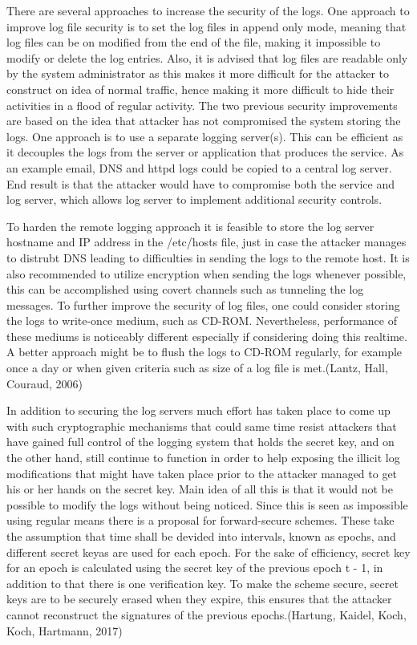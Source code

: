 \documentclass{article}
\begin{document}
There are several approaches to increase the security of the logs. One approach to improve log file security is to set the log files in append only mode, meaning that log files can be on modified from the end of the file, making it impossible to modify or delete the log entries. Also, it is advised that log files are readable only by the system administrator as this makes it more difficult for the attacker to construct on idea of normal traffic, hence making it more difficult to hide their activities in a flood of regular activity. The two previous security improvements are based on the idea that attacker has not compromised the system storing the logs.  One approach is to use a separate logging server(s). This can be efficient as it decouples the logs from the server or application that produces the service. As an example email, DNS and httpd logs could be copied to a central log server. End result is that the attacker would have to compromise both the service and log server, which allows log server to implement additional security controls.
\par
To harden the remote logging approach it is feasible to store the log server hostname and IP address in the /etc/hosts file, just in case the attacker manages to distrubt DNS leading to difficulties in sending the logs to the remote host. It is also recommended to utilize encryption when sending the logs whenever possible, this can be accomplished using covert channels such as tunneling the log messages. To further improve the security of log files, one could consider storing the logs to write-once medium, such as CD-ROM. Nevertheless, performance of these mediums is noticeably different especially if considering doing this realtime. A better approach might be to flush the logs to CD-ROM regularly, for example once a day or when given criteria such as size of a log file is met.(Lantz, Hall, Couraud, 2006)
\par
In addition to securing the log servers much effort has taken place to come up with such cryptographic mechanisms that could same time resist attackers that have gained full control of the logging system that holds the secret key, and on the other hand, still continue to function in order to help exposing the illicit log modifications that might have taken place prior to the attacker managed to get his or her hands on the secret key. Main idea of all this is that it would not be possible to modify the logs without being noticed. Since this is seen as impossible using regular means there is a proposal for forward-secure schemes. These take the assumption that time shall be devided into intervals, known as epochs, and different secret keyas are used for each epoch. For the sake of efficiency, secret key for an epoch is calculated using the secret key of the previous epoch t - 1, in addition to that there is one verification key. To make the scheme secure, secret keys are to be securely erased when they expire, this ensures that the attacker cannot reconstruct the signatures of the previous epochs.(Hartung, Kaidel, Koch, Koch, Hartmann, 2017)
\end{document}
